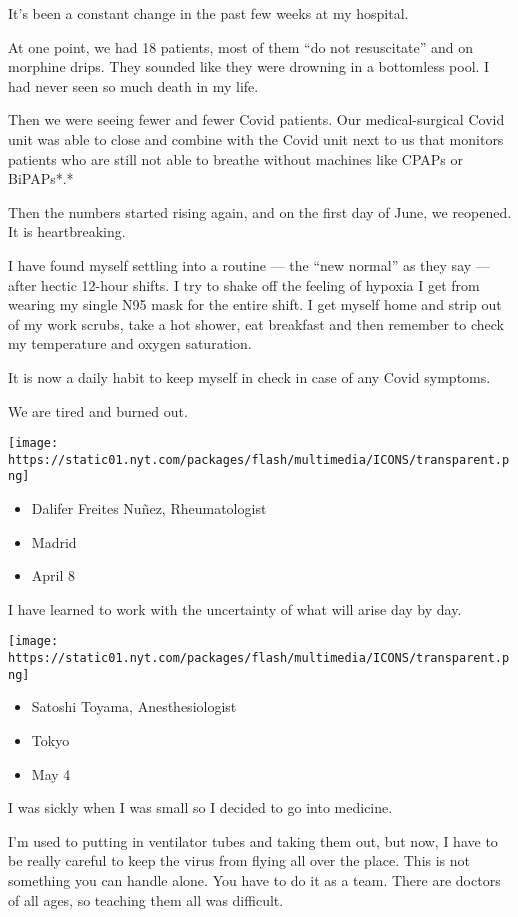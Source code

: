 It's been a constant change in the past few weeks at my hospital.

At one point, we had 18 patients, most of them ``do not resuscitate''
and on morphine drips. They sounded like they were drowning in a
bottomless pool. I had never seen so much death in my life.

Then we were seeing fewer and fewer Covid patients. Our medical-surgical
Covid unit was able to close and combine with the Covid unit next to us
that monitors patients who are still not able to breathe without
machines like CPAPs or BiPAPs*.*

Then the numbers started rising again, and on the first day of June, we
reopened. It is heartbreaking.

I have found myself settling into a routine --- the ``new normal'' as
they say --- after hectic 12-hour shifts. I try to shake off the feeling
of hypoxia I get from wearing my single N95 mask for the entire shift. I
get myself home and strip out of my work scrubs, take a hot shower, eat
breakfast and then remember to check my temperature and oxygen
saturation.

It is now a daily habit to keep myself in check in case of any Covid
symptoms.

We are tired and burned out.

\texttt{[image: https://static01.nyt.com/packages/flash/multimedia/ICONS/transparent.png]}

\begin{itemize}
\tightlist
\item
  Dalifer Freites Nuñez, Rheumatologist
\item
  Madrid
\item
  April 8
\end{itemize}

I have learned to work with the uncertainty of what will arise day by
day.

\texttt{[image: https://static01.nyt.com/packages/flash/multimedia/ICONS/transparent.png]}

\begin{itemize}
\tightlist
\item
  Satoshi Toyama, Anesthesiologist
\item
  Tokyo
\item
  May 4
\end{itemize}

I was sickly when I was small so I decided to go into medicine.

I'm used to putting in ventilator tubes and taking them out, but now, I
have to be really careful to keep the virus from flying all over the
place. This is not something you can handle alone. You have to do it as
a team. There are doctors of all ages, so teaching them all was
difficult.

